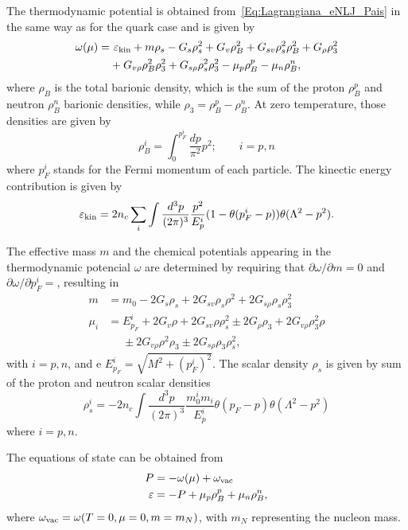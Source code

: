\documentclass[prc, reprint, amsmath, floatfix, linenumbers,10pt]{revtex4-1}
\begin{document}
The thermodynamic potential is obtained from~\eqref{Eq:Lagrangiana_eNLJ_Pais} in the same way as for the quark case and is given by
\begin{equation}\label{Eq:potencial_termodinamico}
\begin{split}
	\omega(\mu) =&~ \varepsilon_{\rm{kin}} + m\rho_s - G_s\rho_s^2 + G_v\rho_B^2 + G_{sv}\rho_s^2\rho_B^2 + G_\rho\rho_3^2 \\
	&+ G_{v\rho}\rho_B^2\rho_3^2 + G_{s\rho}\rho_s^2\rho_3^2 - \mu_p\rho_B^p - \mu_n\rho_B^n,
\end{split}
\end{equation}
%
where $\rho_B$ is the total barionic density, which is the sum of the proton $\rho_B^p$ and neutron $\rho_B^n$ barionic densities, while $\rho_3 = \rho_B^p - \rho_B^n$. At zero temperature, those densities are given by
\begin{equation}
	\rho_B^i = \int_0^{p_F^i}\frac{dp}{\pi^2}p^2; \qquad i = p,n
\end{equation}
%
where $p_F^i$ stands for the Fermi momentum of each particle. The kinectic energy contribution is given by
\begin{equation}
	\varepsilon_{\rm{kin}} = 2 n_c \sum_i \int \frac{d^3p}{(2\pi)^3}\frac{p^2}{E_p^i}(1 - \theta(p_F^i - p))\theta(\Lambda^2 - p^2).
\end{equation}

The effective mass $m$ and the chemical potentials appearing in the thermodynamic potencial $\omega$ are determined by requiring that $\partial\omega/\partial m = 0$ and $\partial\omega/\partial p_F^i = $, resulting in
\begin{align}\label{Eq:Gap}
	m &= m_0 - 2G_s\rho_s + 2G_{sv}\rho_s\rho^2 + 2 G_{s\rho}\rho_s\rho_3^2 \\
	\mu_i &= E_{p_F}^i + 2G_v\rho + 2G_{sv}\rho\rho_s^2 \pm 2G_\rho\rho_3+2G_{v\rho}\rho_3^2\rho \nonumber \\
	&\phantom{=} \pm 2G_{v\rho}\rho^2\rho_3 \pm 2 G_{s\rho}\rho_3\rho_s^2,
\end{align}
%
with $i = p,n$, and e $E_{p_F}^i = \sqrt{M^2 + (p_F^i)^2}$. The scalar density $\rho_s$ is given by sum of the proton and neutron scalar densities
\begin{equation}
	\rho_s^i = - 2 n_c \int \frac{d^3p}{(2\pi)^3}\frac{m_0^i m_i}{E_p^i}\theta(p_F - p)\theta(\Lambda^2 - p^2)
\end{equation}
%
where $i = p, n$.

The equations of state can be obtained from
\begin{align}
	P &= -\omega(\mu) + \omega_{\rm{vac}} \\
	\varepsilon &= -P + \mu_p \rho_B^p + \mu_n \rho_B^n,
\end{align}
%
where $\omega_{\rm{vac}} = \omega(T = 0, \mu = 0, m = m_N)$, with $m_N$ representing the nucleon mass. 
\end{document}
